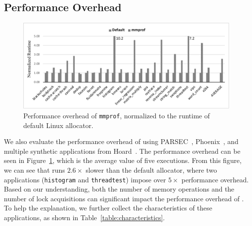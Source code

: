  








\subsection{Performance Overhead}
\label{sec:perf}

\begin{figure}[!ht]
\centering
\includegraphics[width=5.5in]{figures/perfoverhead}
\caption{Performance overhead of \texttt{mmprof}, normalized to the runtime of default Linux allocator.\label{fig:overhead}}
\end{figure}

We also evaluate the performance overhead of 
\MP{} using PARSEC~\citep{parsec},  Phoenix~\citep{phoenix}, and multiple synthetic applications from Hoard~\cite{Hoard}. The performance overhead can be seen in Figure~\ref{fig:overhead}, which is the average value of five executions. From this figure, we can see that \MP{} runs $2.6\times$ slower than the default allocator, where two applications (\texttt{histogram} and \texttt{threadtest}) impose over $5\times$ performance overhead. Based on our understanding, both the number of memory operations and the number of lock acquisitions can significant impact  the performance overhead of \MM{}. To help the explanation, we further collect the characteristics of these applications, as shown in Table~\ref{table:characteristics}.  

